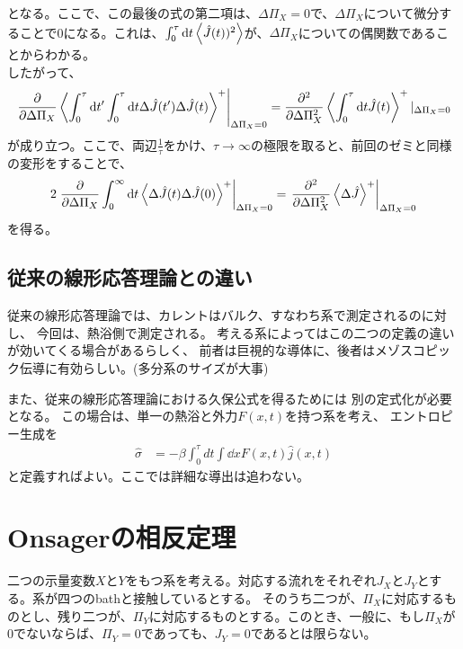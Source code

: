 \documentclass[a4paper,11pt]{jsarticle}
\begin{document}
となる。ここで、この最後の式の第二項は、$\Delta \Pi_X=0$で、$\Delta \Pi_X$について微分することで0になる。これは、$\int_0 ^{\tau} \dd t \ev{\hat{J}(t))^2}$が、$\Delta \Pi_X$についての偶関数であることからわかる。\\
したがって、
\begin{align} 
    \left.\pdv{\Delta \Pi_X} \ev{\int_0 ^{\tau} \dd t' \int_0 ^{\tau} \dd t \Delta \hat{J}(t')\Delta \hat{J}(t)}^+\right|_{\Delta \Pi_X = 0} = \pdv[2]{\Delta \Pi_X} \ev{\int_0 ^{\tau} \dd t \hat{J}(t)}^+|_{\Delta \Pi_X = 0}
\end{align}
が成り立つ。ここで、両辺$\frac{1}{\tau}$をかけ、$\tau \to \infty$の極限を取ると、前回のゼミと同様の変形をすることで、
\begin{align}
    2\left.\pdv{\Delta \Pi_X} \int_0 ^{\infty} \dd t \ev{\Delta \hat{J}(t) \Delta \hat{J}(0)}^+\right|_{\Delta \Pi_X = 0} = \left.\pdv[2]{\Delta \Pi_X} \ev{\Delta \hat{J}}^+\right|_{\Delta \Pi_X = 0}
\end{align}
を得る。\hfill \qedsymbol

\subsection{従来の線形応答理論との違い}
従来の線形応答理論では、カレントはバルク、すなわち系で測定されるのに対し、
今回は、熱浴側で測定される。
考える系によってはこの二つの定義の違いが効いてくる場合があるらしく、
前者は巨視的な導体に、後者はメゾスコピック伝導に有効らしい。(多分系のサイズが大事)

また、従来の線形応答理論における久保公式を得るためには
別の定式化が必要となる。
この場合は、単一の熱浴と外力$F(x,t)$を持つ系を考え、
エントロピー生成を
\begin{align}
    \hat{\sigma} &= -\beta \int_0 ^{\tau} dt \int \dd{x} F(x,t) \hat{j}(x,t)
\end{align}
と定義すればよい。ここでは詳細な導出は追わない。

\section{Onsagerの相反定理}
二つの示量変数$X$と$Y$をもつ系を考える。対応する流れをそれぞれ$J_X$と$J_Y$とする。系が四つのbathと接触しているとする。
そのうち二つが、$\Pi_X$に対応するものとし、残り二つが、$\Pi_Y$に対応するものとする。このとき、一般に、もし$\Pi_X$が$0$でないならば、$\Pi_Y=0$であっても、$J_Y=0$であるとは限らない。\\
\end{document}
